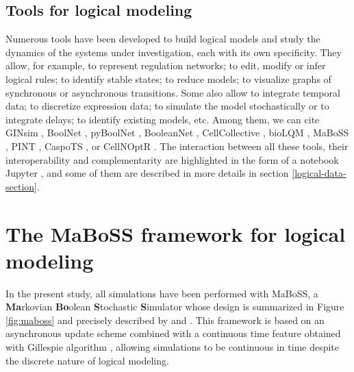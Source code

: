 \documentclass[a4paper,12pt,twoside,onecolumn,openright,final,oldfontcommands]{memoir}
\begin{document}
\subsection{Tools for logical modeling}\label{logical-tools-list}

Numerous tools have been developed to build logical models and study the
dynamics of the systems under investigation, each with its own
specificity. They allow, for example, to represent regulation networks;
to edit, modify or infer logical rules; to identify stable states; to
reduce models; to visualize graphs of synchronous or asynchronous
transitions. Some also allow to integrate temporal data; to discretize
expression data; to simulate the model stochastically or to integrate
delays; to identify existing models, etc. Among them, we can cite GINsim
\citep{naldi2018logical}, BoolNet \citep{mussel2010boolnet}, pyBoolNet
\citep{klarner2016pyboolnet}, BooleanNet \citep{albert2008boolean},
CellCollective \citep{helikar2012cell}, bioLQM \citep{naldi2018biolqm},
MaBoSS \citep{stoll2012continuous, stoll2017maboss}, PINT \citep{Pint},
CaspoTS \citep{ostrowski2016boolean}, or CellNOptR
\citep{terfve2012cellnoptr}. The interaction between all these tools,
their interoperability and complementarity are highlighted in the form
of a notebook Jupyter \citep{naldi2018colomoto}, and some of them are
described in more details in section \ref{logical-data-section}.

\section{The MaBoSS framework for logical
modeling}\label{maboss-section}

In the present study, all simulations have been performed with MaBoSS, a
\textbf{Ma}rkovian \textbf{Bo}olean \textbf{S}tochastic
\textbf{S}imulator whose design is summarized in Figure \ref{fig:maboss}
and precisely described by \citet{stoll2012continuous} and
\citet{stoll2017maboss}. This framework is based on an asynchronous
update scheme combined with a continuous time feature obtained with
Gillespie algorithm \citep{gillespie1976general}, allowing simulations
to be continuous in time despite the discrete nature of logical
modeling.
\end{document}
